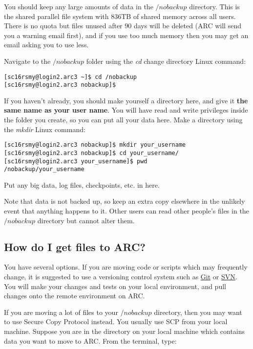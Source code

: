 \documentclass[]{article}
\begin{document}
You should keep any large amounts of data in the \(/nobackup\) directory. This is the shared parallel file system with 836TB of shared memory across all users. There is no quota but files unused after 90 days will be deleted (ARC will send you a warning email first), and if you use too much memory then you may get an email asking you to use less.

Navigate to the  \(/nobackup\) folder using the \textit{cd} change directory Linux command:

\begin{lstlisting}
[sc16rsmy@login2.arc3 ~]$ cd /nobackup
[sc16rsmy@login2.arc3 nobackup]$ 
\end{lstlisting}

If you haven't already, you should make yourself a directory here, and give it \textbf{the same name as your user name}. You will have read and write privileges inside the folder you create, so you can put all your data here. Make a directory using the \textit{mkdir} Linux command:

\begin{lstlisting}
[sc16rsmy@login2.arc3 nobackup]$ mkdir your_username
[sc16rsmy@login2.arc3 nobackup]$ cd your_username/
[sc16rsmy@login2.arc3 your_username]$ pwd
/nobackup/your_username
\end{lstlisting}

Put any big data, log files, checkpoints, etc. in here.

Note that data is not backed up, so keep an extra copy elsewhere in the unlikely event that anything happens to it. Other users can read other people's files in the \(/nobackup\) directory but cannot alter them.

\subsection{How do I get files to ARC?}
\label{scp}

You have several options. If you are moving code or scripts which may frequently change, it is suggested to use a versioning control system such as \href{https://git-scm.com/}{Git} or \href{https://subversion.apache.org/}{SVN}. You will make your changes and tests on your local environment, and pull changes onto the remote environment on ARC.

If you are moving a lot of files to your \(/nobackup\) directory, then you may want to use Secure Copy Protocol instead. You usually use SCP from your local machine. Suppose you are in the directory on your local machine which contains data you want to move to ARC. From the terminal, type:
\end{document}
